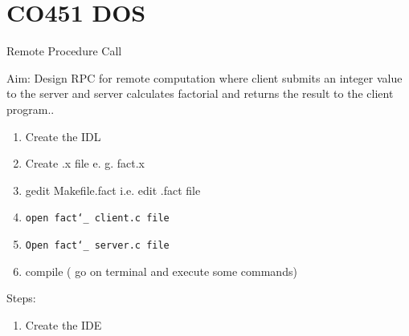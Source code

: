 \documentclass{beamer}
\author[Govt. Colleg of Engg, Jalgaon]{}
\begin{document}
   


\section{CO451 DOS}
\begin{frame}

\begin{center}
	\huge Remote Procedure Call\\
\end{center}

\end{frame} 

\begin{frame}
	Aim: Design RPC for remote computation where client submits an integer value to the server and server calculates factorial and returns the result to the client program..
	\vspace{0.5cm}
	\begin{enumerate}
		\item Create the IDL
		\item Create .x file e. g. fact.x
		\item gedit Makefile.fact  i.e. edit .fact file
		\item \texttt{open fact\char`_ client.c file}
 		\item \texttt{Open fact\char`_ server.c file} 
 		\item compile ( go on terminal and execute some commands)
	\end{enumerate}
	\vspace{2cm}
\end{frame}

\begin{frame}
	Steps:\\
	\begin{enumerate}
	\item Create the IDE\\
		
	\end{enumerate}
	
\end{frame}
\end{document}
